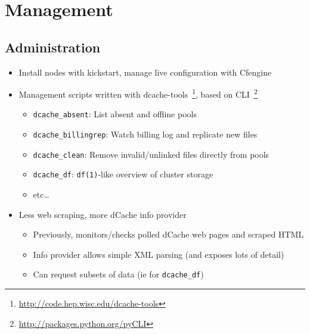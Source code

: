 \documentclass{beamer}
\begin{document}
\section{Management}
\subsection{Administration}
\begin{frame}
\begin{itemize}
	\item Install nodes with kickstart, manage live configuration with Cfengine
	\item Management scripts written with dcache-tools~\footnote{\url{http://code.hep.wisc.edu/dcache-tools}}, based on CLI~\footnote{\url{http://packages.python.org/pyCLI}}
	\begin{itemize}
		\item {\tt dcache\_absent}: List absent and offline pools
		\item {\tt dcache\_billingrep}: Watch billing log and replicate new files
		\item {\tt dcache\_clean}: Remove invalid/unlinked files directly from pools
		\item {\tt dcache\_df}: {\tt df(1)}-like overview of cluster storage
		\item etc\ldots{}
	\end{itemize}
	\item Less web scraping, more dCache info provider
	\begin{itemize}
		\item Previously, monitors/checks polled dCache web pages and scraped HTML
		\item Info provider allows simple XML parsing (and exposes lots of detail)
		\item Can request subsets of data (ie for {\tt dcache\_df})
	\end{itemize}
\end{itemize}
\end{frame}
\end{document}
